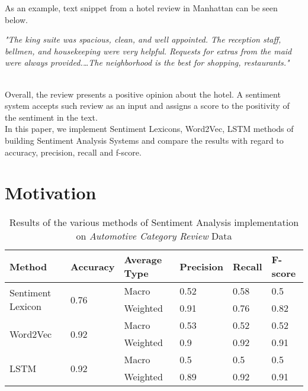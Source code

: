 \documentclass[11pt,a4paper]{article}
\begin{document}
As an example, text snippet from a hotel review in Manhattan can be seen below.\\

\parbox{0.45\textwidth}{
	\centering
	\small
	\textit{
		"The king suite was spacious, clean, and well appointed. The reception staff, bellmen, and housekeeping were very helpful. Requests for extras from the maid were always provided.\ldots The neighborhood is the best for shopping, restaurants." \cite{ronen}
	}
}\\

Overall, the review presents a positive opinion about the hotel. A sentiment system accepts such review as an input and assigns a score to the positivity of the sentiment in the text. \\

In this paper, we implement Sentiment Lexicons, Word2Vec, LSTM methods of building Sentiment Analysis Systems and compare the results with regard to accuracy, precision, recall and f-score. 


\section{Motivation}

\begin{table*}[ht]
	\centering
	\begin{tabular}{|l|l|l|l|l|l|}
		\hline
		\textbf{Method} & \textbf{Accuracy} & \textbf{Average Type} & \textbf{Precision} & \textbf{Recall} & \textbf{F-score} \\ \hline
		\multirow{2}{*}{Sentiment Lexicon} & \multirow{2}{*}{0.76} & Macro & 0.52 & 0.58 & 0.5 \\ \cline{3-6}
		& & Weighted & 0.91 & 0.76 & 0.82 \\ \hline
		\multirow{2}{*}{Word2Vec} & \multirow{2}{*}{0.92} & Macro & 0.53 & 0.52 & 0.52\\ \cline{3-6}
		& & Weighted & 0.9 & 0.92 & 0.91 \\ \hline
		\multirow{2}{*}{LSTM} & \multirow{2}{*}{0.92} & Macro & 0.5 & 0.5 & 0.5 \\ \cline{3-6}
		& & Weighted & 0.89 & 0.92 & 0.91 \\ \hline  
	\end{tabular}
\caption{Results of the various methods of Sentiment Analysis implementation on \textit{Automotive Category Review} Data}
\end{table*}
\end{document}
